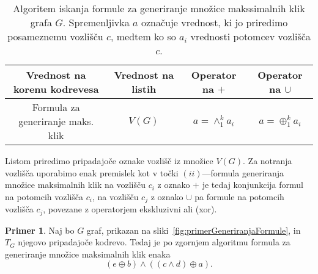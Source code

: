 \documentclass[12pt,a4paper,twoside]{article}
\theoremstyle{definition} %
\newtheorem{primer}[definicija]{Primer}
\theoremstyle{plain} %
\numberwithin{equation}{section}  %
\begin{document}
\begin{enumerate}[label=($\roman*$)]
\begin{table}[h!]
\begin{adjustbox}{width=\columnwidth,center}
\begin{tabular}{c|ccc}
Vrednost na korenu kodrevesa & Vrednost na listih   & Operator na $+$   &  Operator na $\cup$  \\ \hline
Formula za generiranje maks. klik & $V(G)$     &   $a=\land_1^k a_i $   &     $a=\oplus_1^k a_i$  
\end{tabular}
\end{adjustbox}
\caption{Algoritem iskanja formule za generiranje množice makssimalnih klik grafa $G$. Spremenljivka $a$ označuje vrednost, ki jo priredimo posameznemu vozlišču $c$, medtem ko so $a_i$ vrednosti potomcev vozlišča $c$.}
\label{tab:generiranje}
\end{table}

Listom priredimo pripadajoče oznake vozlišč iz množice $V(G)$. Za notranja vozlišča uporabimo enak premislek kot v točki $(ii)$---formula generiranja množice maksimalnih klik na vozlišču $c_i$ z oznako $+$ je tedaj konjunkcija formul na potomcih vozlišča $c_i$, na vozlišču $c_j$ z oznako $\cup$ pa formule na potomcih vozlišča $c_j$, povezane z operatorjem ekskluzivni ali (xor).

\begin{primer}\label{primerGeneriranje}
Naj bo $G$ graf, prikazan na sliki~\ref{fig:primerGeneriranjaFormule}, in $T_G$ njegovo pripadajoče kodrevo. Tedaj je po zgornjem algoritmu formula za generiranje množice maksimalnih klik enaka
$$(e \oplus b) \land ((c \land d) \oplus a).$$

\begin{figure}[h!]
\centering
 
\hspace{15pt}
\end{figure}
\end{primer}
\end{enumerate}
\end{document}
